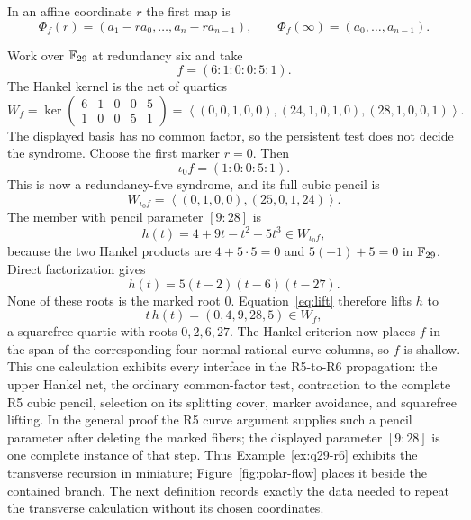 In an affine coordinate $r$ the first map is
\[
\Phi_f(r)=(a_1-ra_0,\ldots,a_n-ra_{n-1}),\qquad
\Phi_f(\infty)=(a_0,\ldots,a_{n-1}).
\]

\begin{example}[The complete R5-to-R6 propagation at $q=29$]
\label{ex:q29-r6}
Work over $\mathbb F_{29}$ at redundancy six and take
\[
 f=(6:1:0:0:5:1).
\]
The Hankel kernel is the net of quartics
\[
 W_f=\ker
 \begin{pmatrix}6&1&0&0&5\\1&0&0&5&1\end{pmatrix}
 =
 \left\langle
 (0,0,1,0,0),(24,1,0,1,0),(28,1,0,0,1)
 \right\rangle .
\]
The displayed basis has no common factor, so the persistent test does
not decide the syndrome.  Choose the first marker $r=0$.  Then
\[
 \iota_0f=(1:0:0:5:1).
\]
This is now a redundancy-five syndrome, and its full cubic pencil is
\[
 W_{\iota_0f}
 =\left\langle(0,1,0,0),(25,0,1,24)\right\rangle .
\]
The member with pencil parameter \([9:28]\) is
\[
 h(t)=4+9t-t^2+5t^3\in W_{\iota_0f},
\]
because the two Hankel products are $4+5\cdot5=0$ and
$5(-1)+5=0$ in $\mathbb F_{29}$.  Direct factorization gives
\[
 h(t)=5(t-2)(t-6)(t-27).
\]
None of these roots is the marked root $0$.  Equation~\eqref{eq:lift}
therefore lifts $h$ to
\[
 t\,h(t)=(0,4,9,28,5)\in W_f,
\]
a squarefree quartic with roots $0,2,6,27$.  The Hankel criterion now
places $f$ in the span of the corresponding four normal-rational-curve
columns, so $f$ is shallow.  This one calculation exhibits every
interface in the R5-to-R6 propagation: the upper Hankel net, the
ordinary common-factor test, contraction to the complete R5 cubic
pencil, selection on its splitting cover, marker avoidance, and
squarefree lifting.  In the general proof the R5 curve argument
supplies such a pencil parameter after deleting the marked fibers; the
displayed parameter \([9:28]\) is one complete instance of that step.
Thus Example~\ref{ex:q29-r6} exhibits the transverse recursion in miniature;
Figure~\ref{fig:polar-flow} places it beside the contained branch.  The next
definition records exactly the data needed to repeat the transverse
calculation without its chosen coordinates.
\end{example}


